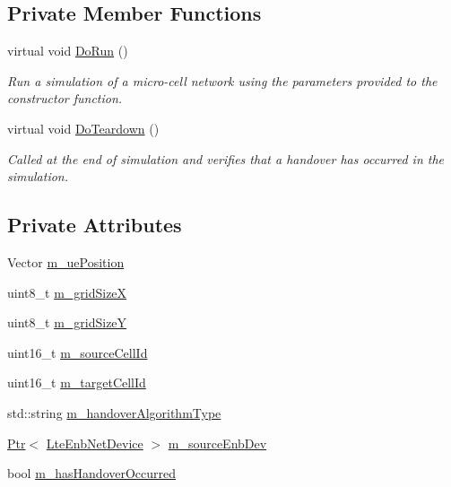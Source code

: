 \subsection*{Private Member Functions}
\begin{DoxyCompactItemize}
\item 
virtual void \hyperlink{classLteHandoverTargetTestCase_adc2ffaf5e89accdbf70756ad9a92ce2c}{Do\+Run} ()
\begin{DoxyCompactList}\small\item\em Run a simulation of a micro-\/cell network using the parameters provided to the constructor function. \end{DoxyCompactList}\item 
virtual void \hyperlink{classLteHandoverTargetTestCase_ad98f734fe74a8a8c04428947a68f1fba}{Do\+Teardown} ()
\begin{DoxyCompactList}\small\item\em Called at the end of simulation and verifies that a handover has occurred in the simulation. \end{DoxyCompactList}\end{DoxyCompactItemize}
\subsection*{Private Attributes}
\begin{DoxyCompactItemize}
\item 
Vector \hyperlink{classLteHandoverTargetTestCase_aba4c81ee775bfd5ea7731bd9663b4d58}{m\+\_\+ue\+Position}
\item 
uint8\+\_\+t \hyperlink{classLteHandoverTargetTestCase_ad4b214cbc0eba746b7f87d8de07c5cce}{m\+\_\+grid\+SizeX}
\item 
uint8\+\_\+t \hyperlink{classLteHandoverTargetTestCase_a2abec8dc89b147c33071eca7475255e3}{m\+\_\+grid\+SizeY}
\item 
uint16\+\_\+t \hyperlink{classLteHandoverTargetTestCase_aa919cf50724c078e53ca949f381d8b8a}{m\+\_\+source\+Cell\+Id}
\item 
uint16\+\_\+t \hyperlink{classLteHandoverTargetTestCase_adaf3b92375a8c58e00ff625af6f5a218}{m\+\_\+target\+Cell\+Id}
\item 
std\+::string \hyperlink{classLteHandoverTargetTestCase_a2bc86aca3c0c446f90d26a572a58d2b9}{m\+\_\+handover\+Algorithm\+Type}
\item 
\hyperlink{classns3_1_1Ptr}{Ptr}$<$ \hyperlink{classns3_1_1LteEnbNetDevice}{Lte\+Enb\+Net\+Device} $>$ \hyperlink{classLteHandoverTargetTestCase_a1aff8bd42d4c6475f92ca6dfe92d56a6}{m\+\_\+source\+Enb\+Dev}
\item 
bool \hyperlink{classLteHandoverTargetTestCase_a43ac75885c19c66c1e3d125275f5212b}{m\+\_\+has\+Handover\+Occurred}
\end{DoxyCompactItemize}
